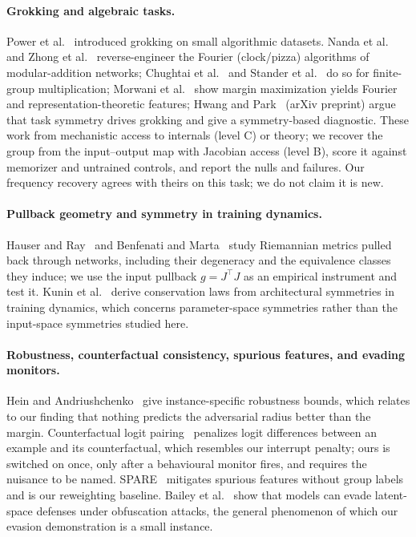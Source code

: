 \paragraph{Grokking and algebraic tasks.}
Power et al.~\cite{power2022} introduced grokking on small algorithmic datasets. Nanda et al.~\cite{nanda2023} and Zhong et al.~\cite{zhong2023} reverse-engineer the Fourier (clock/pizza) algorithms of modular-addition networks; Chughtai et al.~\cite{chughtai2023} and Stander et al.~\cite{stander2024} do so for finite-group multiplication; Morwani et al.~\cite{morwani2024} show margin maximization yields Fourier and representation-theoretic features; Hwang and Park~\cite{intrinsic2026} (arXiv preprint) argue that task symmetry drives grokking and give a symmetry-based diagnostic. These work from mechanistic access to internals (level C) or theory; we recover the group from the input--output map with Jacobian access (level B), score it against memorizer and untrained controls, and report the nulls and failures. Our frequency recovery agrees with theirs on this task; we do not claim it is new.

\paragraph{Pullback geometry and symmetry in training dynamics.}
Hauser and Ray~\cite{hauser2017} and Benfenati and Marta~\cite{benfenati2023,benfenati2023b} study Riemannian metrics pulled back through networks, including their degeneracy and the equivalence classes they induce; we use the input pullback $g=J^\top J$ as an empirical instrument and test it. Kunin et al.~\cite{kunin2021} derive conservation laws from architectural symmetries in training dynamics, which concerns parameter-space symmetries rather than the input-space symmetries studied here.

\paragraph{Robustness, counterfactual consistency, spurious features, and evading monitors.}
Hein and Andriushchenko~\cite{hein2017} give instance-specific robustness bounds, which relates to our finding that nothing predicts the adversarial radius better than the margin. Counterfactual logit pairing~\cite{garg2019} penalizes logit differences between an example and its counterfactual, which resembles our interrupt penalty; ours is switched on once, only after a behavioural monitor fires, and requires the nuisance to be named. SPARE~\cite{spare} mitigates spurious features without group labels and is our reweighting baseline. Bailey et al.~\cite{bailey} show that models can evade latent-space defenses under obfuscation attacks, the general phenomenon of which our evasion demonstration is a small instance.
